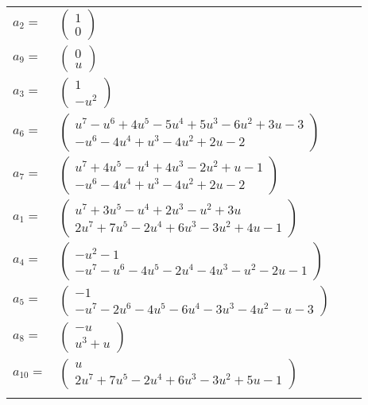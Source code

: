 \documentclass[1p]{elsarticle_modified}
\theoremstyle{definition}
\begin{document}
\begin{tabular}{m{7pt} m{180pt} m{7pt} m{180pt} }
\flushright $a_{2}=$&$\begin{pmatrix}1\\0\end{pmatrix}$ \\
\flushright $a_{9}=$&$\begin{pmatrix}0\\u\end{pmatrix}$ \\
\flushright $a_{3}=$&$\begin{pmatrix}1\\- u^2\end{pmatrix}$ \\
\flushright $a_{6}=$&$\begin{pmatrix}u^7- u^6+4 u^5-5 u^4+5 u^3-6 u^2+3 u-3\\- u^6-4 u^4+u^3-4 u^2+2 u-2\end{pmatrix}$ \\
\flushright $a_{7}=$&$\begin{pmatrix}u^7+4 u^5- u^4+4 u^3-2 u^2+u-1\\- u^6-4 u^4+u^3-4 u^2+2 u-2\end{pmatrix}$ \\
\flushright $a_{1}=$&$\begin{pmatrix}u^7+3 u^5- u^4+2 u^3- u^2+3 u\\2 u^7+7 u^5-2 u^4+6 u^3-3 u^2+4 u-1\end{pmatrix}$ \\
\flushright $a_{4}=$&$\begin{pmatrix}- u^2-1\\- u^7- u^6-4 u^5-2 u^4-4 u^3- u^2-2 u-1\end{pmatrix}$ \\
\flushright $a_{5}=$&$\begin{pmatrix}-1\\- u^7-2 u^6-4 u^5-6 u^4-3 u^3-4 u^2- u-3\end{pmatrix}$ \\
\flushright $a_{8}=$&$\begin{pmatrix}- u\\u^3+u\end{pmatrix}$ \\
\flushright $a_{10}=$&$\begin{pmatrix}u\\2 u^7+7 u^5-2 u^4+6 u^3-3 u^2+5 u-1\end{pmatrix}$\\&\end{tabular}
\end{document}
